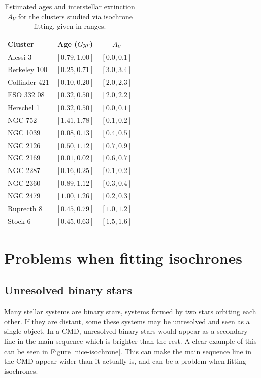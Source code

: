 \documentclass[twocolumn]{revtex4}
\begin{document}
\begin{table}[h!]
\begin{tabular}{|l|c|c|}
\hline
\textbf{Cluster} & \textbf{Age ($\si{Gyr}$)} & \textbf{$A_V$} \\
\hline
Alessi 3 & $[0.79, 1.00]$ & $[0.0, 0.1]$ \\
\hline
Berkeley 100 & $[0.25, 0.71]$ & $[3.0, 3.4]$ \\
\hline
Collinder 421 & $[0.10, 0.20]$ & $[2.0, 2.3]$ \\
\hline
ESO 332 08 & $[0.32, 0.50]$ & $[2.0, 2.2]$ \\
\hline
Herschel 1 & $[0.32, 0.50]$ & $[0.0, 0.1]$  \\
\hline
NGC 752 & $[1.41, 1.78]$ & $[0.1, 0.2]$  \\
\hline
NGC 1039 & $[0.08, 0.13]$ & $[0.4, 0.5]$  \\
\hline
NGC 2126 & $[0.50, 1.12]$ & $[0.7, 0.9]$ \\
\hline
NGC 2169 & $[0.01, 0.02]$ & $[0.6, 0.7]$ \\
\hline
NGC 2287 & $[0.16, 0.25]$ & $[0.1, 0.2]$ \\
\hline
NGC 2360 & $[0.89, 1.12]$ & $[0.3, 0.4]$ \\
\hline
NGC 2479 & $[1.00, 1.26]$ & $[0.2, 0.3]$ \\
\hline
Ruprecth 8 & $[0.45, 0.79]$ & $[1.0, 1.2]$ \\
\hline
Stock 6 & $[0.45, 0.63]$ & $[1.5, 1.6]$ \\
\hline
\end{tabular}
\caption{Estimated ages and interstellar extinction $A_V$ for the clusters studied via isochrone fitting, given in ranges.}
\label{tab:fitting-results}
\end{table}

\section{Problems when fitting isochrones}
\subsection{Unresolved binary stars}
Many stellar systems are binary stars, systems formed by two stars orbiting each other. If they are distant, some these systems may be unresolved and seen as a single object. In a CMD, unresolved binary stars would appear as a secondary line in the main sequence which is brighter than the rest. A clear example of this can be seen in Figure \ref{nice-isochrone}. This can make the main sequence line in the CMD appear wider than it actually is, and can be a problem when fitting isochrones.
\end{document}
